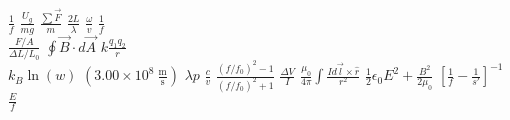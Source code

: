 \documentclass{article}
\begin{document}
$\frac{1}{f}$
$\frac{U_g}{mg}$
$\frac{\sum \vec F}{m}$
$\frac{2L}{\lambda}$
$\frac{\omega}{v}$
$\frac{1}{f}$ \\
$\frac{F/A}{\Delta L/L_0}$
$\oint \vec B \cdot d\vec A$
$k \frac{q_1 q_2}{r}$ \\
$k_B \ln(w)$
$(3.00 \times 10^8~\mathrm{\frac m s})$
$\lambda p$
$\frac{c}{v}$
$\frac{(f/f_0)^2 - 1}{(f/f_0)^2 + 1}$
$\frac{\Delta V}{I}$
$\frac{\mu_0}{4\pi} \int\frac{I d\vec l \times \hat r}{r^2}$
$\frac 1 2 \epsilon_0 E^2 + \frac{B^2}{2\mu_0}$
$\left[ \frac{1}{f} - \frac{1}{s'} \right]^{-1}$
$\frac{E}{f}$
\end{document}
